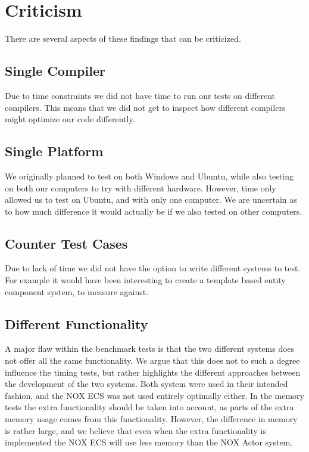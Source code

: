 \section{Criticism}
\label{sec:discussion_criticism}
There are several aspects of these findings that can be criticized.

\subsection{Single Compiler}
Due to time constraints we did not have time to run our tests on different compilers.
This means that we did not get to inspect how different compilers might optimize our code differently.

\subsection{Single Platform}
We originally planned to test on both Windows and Ubuntu, while also testing on both our computers to
try with different hardware. However, time only allowed us to test on Ubuntu, and with only one computer.
We are uncertain as to how much difference it would actually be if we also tested on other computers.

\subsection{Counter Test Cases}
Due to lack of time we did not have the option to write different systems to test.
For example it would have been interesting to create a template based entity component system,
to measure against.

\subsection{Different Functionality}
A major flaw within the benchmark tests is that the two different systems does not offer all the same functionality.
We argue that this does not to such a degree influence the timing tests, but rather highlights the different approaches
between the development of the two systems.
Both system were used in their intended fashion, and the NOX ECS was not used entirely optimally either.
In the memory tests the extra functionality should be taken into account, as parts of the extra memory usage
comes from this functionality.
However, the difference in memory is rather large, and we believe that even when the extra functionality is implemented
the NOX ECS will use less memory than the NOX Actor system.

